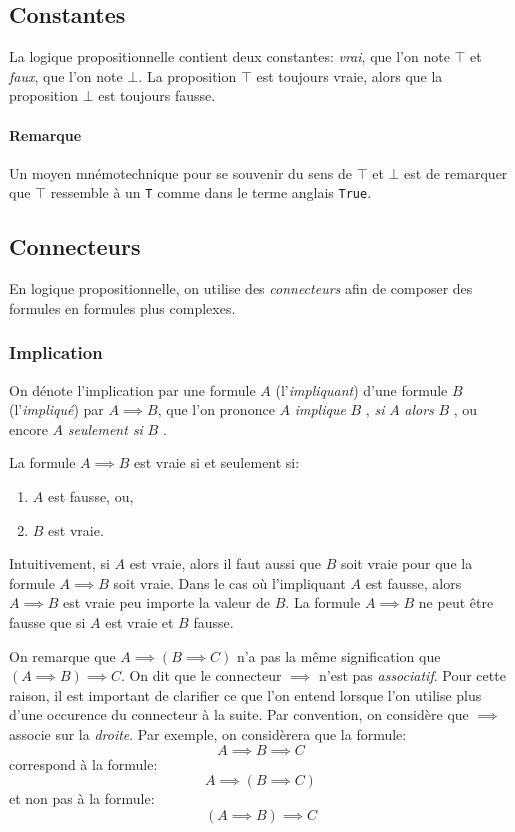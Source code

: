 \subsection{Constantes}

La logique propositionnelle contient deux constantes: \textit{vrai}, que l'on note $\top$ et \textit{faux}, que l'on note $\bot$.
La proposition $\top$ est toujours vraie, alors que la proposition $\bot$ est toujours fausse.

\paragraph{Remarque} Un moyen mnémotechnique pour se souvenir du sens de $\top$ et $\bot$ est de remarquer que $\top$ ressemble à un \texttt{T} comme dans le terme anglais \texttt{True}.

\subsection{Connecteurs}

En logique propositionnelle, on utilise des \textit{connecteurs} afin de composer des formules en formules plus complexes.

\subsubsection{Implication}

On dénote l'implication par une formule $A$ (l'\textit{impliquant}) d'une formule $B$ (l'\textit{impliqué}) par $A \implies B$,
que l'on prononce \og $A$ \textit{implique} $B$ \fg, \og \textit{si} $A$ \textit{alors} $B$ \fg, ou encore \og $A$ \textit{seulement si} $B$ \fg. 

La formule $A \implies B$ est vraie si et seulement si:
\begin{enumerate}
\item
$A$ est fausse, ou,
\item
$B$ est vraie.
\end{enumerate}

Intuitivement, si $A$ est vraie, alors il faut aussi que $B$ soit vraie pour que la formule $A \implies B$ soit vraie.
Dans le cas où l'impliquant $A$ est fausse, alors $A \implies B$ est vraie peu importe la valeur de $B$.
La formule $A \implies B$ ne peut être fausse que si $A$ est vraie et $B$ fausse.

On remarque que $A \implies (B \implies C)$ n'a pas la même signification que $(A \implies B) \implies C$.
On dit que le connecteur ${\implies}$ n'est pas \textit{associatif}.
Pour cette raison, il est important de clarifier ce que l'on entend lorsque l'on utilise plus d'une occurence du connecteur à la suite.
Par convention, on considère que ${\implies}$ associe sur la \textit{droite}.
Par exemple, on considèrera que la formule:
\[
A \implies B \implies C
\]
correspond à la formule:
\[
A \implies (B \implies C)
\]
et non pas à la formule:
\[
(A \implies B) \implies C
\]

